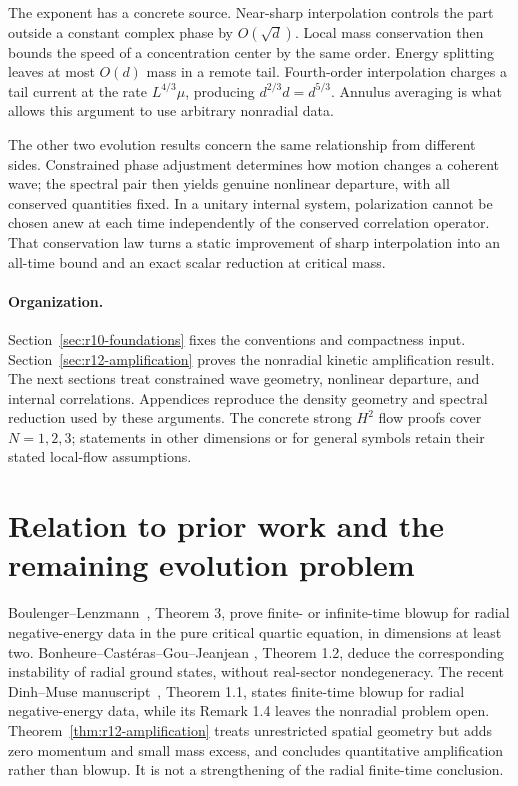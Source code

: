 \documentclass[11pt,a4paper]{article}
\theoremstyle{remark}\newtheorem{remark}[theorem]{Remark}
\begin{document}
The exponent has a concrete source. Near-sharp interpolation controls
the part outside a constant complex phase by $O(\sqrt d)$. Local mass
conservation then bounds the speed of a concentration center by the
same order. Energy splitting leaves at most $O(d)$ mass in a remote
tail. Fourth-order interpolation charges a tail current at the rate
$L^{4/3}\mu$, producing $d^{2/3}d=d^{5/3}$. Annulus averaging is what
allows this argument to use arbitrary nonradial data.

The other two evolution results concern the same relationship from
different sides. Constrained phase adjustment determines how motion
changes a coherent wave; the spectral pair then yields genuine nonlinear
departure, with all conserved quantities fixed. In a unitary internal
system, polarization cannot be chosen anew at each time independently
of the conserved correlation operator. That conservation law turns a
static improvement of sharp interpolation into an all-time bound and
an exact scalar reduction at critical mass.

\paragraph{Organization.}
Section~\ref{sec:r10-foundations} fixes the conventions and compactness
input. Section~\ref{sec:r12-amplification} proves the nonradial kinetic
amplification result. The next sections treat constrained wave geometry,
nonlinear departure, and internal correlations. Appendices reproduce
the density geometry and spectral reduction used by these arguments.
The concrete strong $H^2$ flow proofs cover $N=1,2,3$; statements in
other dimensions or for general symbols retain their stated local-flow
assumptions.







\section{Relation to prior work and the remaining evolution problem}
Boulenger--Lenzmann~\cite{BL}, Theorem 3, prove finite- or infinite-time
blowup for radial negative-energy data in the pure critical quartic
equation, in dimensions at least two. Bonheure--Cast\'eras--Gou--Jeanjean
\cite{BCGJ}, Theorem 1.2, deduce the corresponding instability of radial
ground states, without real-sector nondegeneracy. The recent
Dinh--Muse manuscript~\cite{DM}, Theorem 1.1, states finite-time blowup
for radial negative-energy data, while its Remark 1.4 leaves the
nonradial problem open. Theorem~\ref{thm:r12-amplification} treats
unrestricted spatial geometry but adds zero momentum and small mass
excess, and concludes quantitative amplification rather than blowup.
It is not a strengthening of the radial finite-time conclusion.
\end{document}
